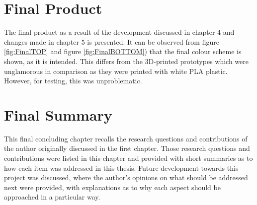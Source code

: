 \section{Final Product}
The final product as a result of the development discussed in chapter 4 and changes made in chapter 5 is presented.
It can be observed from figure \ref{fig:FinalTOP} and figure \ref{fig:FinalBOTTOM}) that the final colour scheme is shown, as it is intended.
This differs from the 3D-printed prototypes which were unglamorous in comparison as they were printed with white PLA plastic.
However, for testing, this was unproblematic.


\section{Final Summary}
This final concluding chapter recalls the research questions and contributions of the author originally discussed in the first chapter.
Those research questions and contributions were listed in this chapter and provided with short summaries as to how each item was addressed in this thesis.
Future development towards this project was discussed, where the author's opinions on what should be addressed next were provided, with explanations as to why each aspect should be approached in a particular way.
